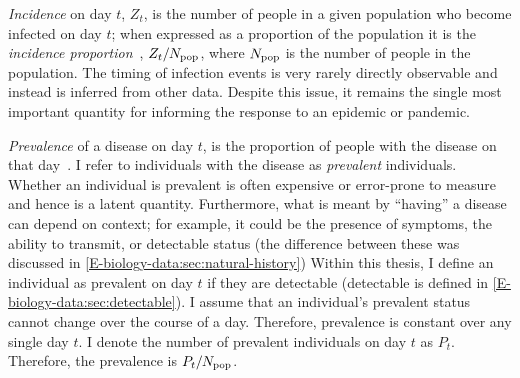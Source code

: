 \documentclass[thesis.tex]{subfiles}
\begin{document}
\emph{Incidence} on day $t$, $Z_t$, is the number of people in a given population who become infected on day $t$; when expressed as a proportion of the population it is the \emph{incidence proportion}~\autocite[89]{lashModern}, $Z_t/N_\text{pop}$, where $N_\text{pop}$ is the number of people in the population.
The timing of infection events is very rarely directly observable and instead is inferred from other data.
Despite this issue, it remains the single most important quantity for informing the response to an epidemic or pandemic.

\emph{Prevalence} of a disease on day $t$, is the proportion of people with the disease on that day~\autocite[90]{lashModern}.
I refer to individuals with the disease as \emph{prevalent} individuals.
Whether an individual is prevalent is often expensive or error-prone to measure and hence is a latent quantity.
Furthermore, what is meant by ``having'' a disease can depend on context; for example, it could be the presence of symptoms, the ability to transmit, or detectable status (the difference between these was discussed in \cref{E-biology-data:sec:natural-history})
Within this thesis, I define an individual as prevalent on day $t$ if they are detectable (detectable is defined in \cref{E-biology-data:sec:detectable}).
I assume that an individual's prevalent status cannot change over the course of a day.
Therefore, prevalence is constant over any single day $t$.
I denote the number of prevalent individuals on day $t$ as $P_t$.
Therefore, the prevalence is $P_t/N_\text{pop}$.
\end{document}
